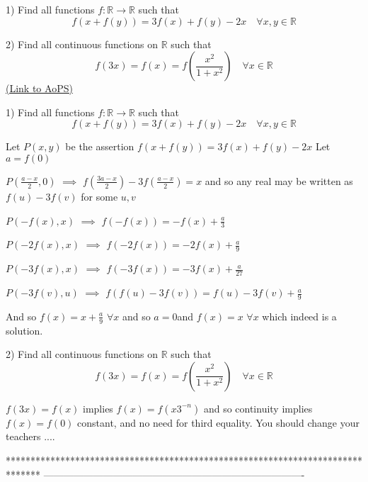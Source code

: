 \begin{problem}
	1) Find all  functions $f:\mathbb{R}\to\mathbb{R}$   such that
\[f\left ( x+f(y)\right )=3f(x)+f(y) -2x \quad \forall x,y \in \mathbb{R}\]

2) Find all continuous functions on $\mathbb{R}$ such that
\[f(3x)=f(x)=f\left(\frac{x^2}{1+x^2}\right)  \quad \forall x\in\mathbb{R}\]
	\flushright \href{https://artofproblemsolving.com/community/c6h563897}{(Link to AoPS)}
\end{problem}



\begin{solution}
	\begin{tcolorbox}1) Find all  functions $f:\mathbb{R}\to\mathbb{R}$   such that
\[f\left ( x+f(y)\right )=3f(x)+f(y) -2x \quad \forall x,y \in \mathbb{R}\]\end{tcolorbox}
Let $P(x,y)$ be the assertion $f(x+f(y))=3f(x)+f(y)-2x$
Let $a=f(0)$

$P(\frac {a-x}2,0)$ $\implies$ $f(\frac {3a-x}2)-3f(\frac {a-x}2)=x$ and so any real may be written as $f(u)-3f(v)$ for some $u,v$

$P(-f(x),x)$ $\implies$ $f(-f(x))=-f(x)+\frac a3$

$P(-2f(x),x)$ $\implies$ $f(-2f(x))=-2f(x)+\frac a9$

$P(-3f(x),x)$ $\implies$ $f(-3f(x))=-3f(x)+\frac a{27}$

$P(-3f(v),u)$ $\implies$ $f(f(u)-3f(v))=f(u)-3f(v)+\frac a{9}$

And so $f(x)=x+\frac a9$ $\forall x$ and so $a=0$and $\boxed{f(x)=x}$ $\forall x$ which indeed is a solution.
\end{solution}



\begin{solution}
	\begin{tcolorbox}2) Find all continuous functions on $\mathbb{R}$ such that
\[f(3x)=f(x)=f\left(\frac{x^2}{1+x^2}\right)  \quad \forall x\in\mathbb{R}\]\end{tcolorbox}
$f(3x)=f(x)$ implies $f(x)=f(x3^{-n})$ and so continuity implies $f(x)=f(0)$ constant, and no need for third equality.
You should change your teachers ....
\end{solution}
*******************************************************************************
-------------------------------------------------------------------------------

